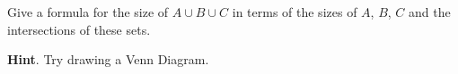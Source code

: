 \documentclass{book}
\begin{document}
\setcounter{cpjt}{219}
\addtocounter{cpjt}{-1}
\begin{activity}\label{threesetintersection}
\hypertarget{p-1174}{}%
Give a formula for the size of \(A\cup B\cup C\) in terms of the sizes of \(A\), \(B\), \(C\) and the intersections of these sets.%
\par\smallskip%
\noindent\textbf{Hint}.\hypertarget{hint-140}{}\quad%
\hypertarget{p-1175}{}%
Try drawing a Venn Diagram.%
\par\smallskip%
\noindent\end{activity}

\clearpage
\end{document}

